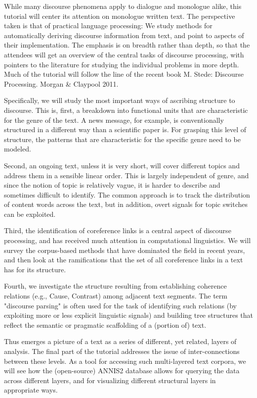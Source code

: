 While many discourse phenomena apply to dialogue and monologue alike, this tutorial will center its attention on monologue written text. The perspective taken is that of practical language processing: We study methods for automatically deriving discourse information from text, and point to aspects of their implementation. The emphasis is on breadth rather than depth, so that the attendees will get an overview of the central tasks of discourse processing, with pointers to the literature for studying the individual problems in more depth. Much of the tutorial will follow the line of the recent book M. Stede: Discourse Processing. Morgan \& Claypool 2011.

Specifically, we will study the most important ways of ascribing structure to discourse. This is, first, a breakdown into functional units that are characteristic for the genre of the text. A news message, for example, is conventionally structured in a different way than a scientific paper is. For grasping this level of structure, the patterns that are characteristic for the specific genre need to be modeled.

Second, an ongoing text, unless it is very short, will cover different topics and address them in a sensible linear order. This is largely independent of genre, and since the notion of topic is relatively vague, it is harder to describe and sometimes difficult to identify. The common approach is to track the distribution of content words across the text, but in addition, overt signals for topic switches can be exploited.

Third, the identification of coreference links is a central aspect of discourse processing, and has received much attention in computational linguistics. We will survey the corpus-based methods that have dominated the field in recent years, and then look at the ramifications that the set of all coreference links in a text has for its structure.

Fourth, we investigate the structure resulting from establishing coherence relations (e.g., Cause, Contrast) among adjacent text segments. The term "discourse parsing" is often used for the task of identifying such relations (by exploiting more or less explicit linguistic signals) and building tree structures that reflect the semantic or pragmatic scaffolding of a (portion of) text.

Thus emerges a picture of a text as a series of different, yet related, layers of analysis. The final part of the tutorial addresses the issue of inter-connections between these levels. As a tool for accessing such multi-layered text corpora, we will see how the (open-source) ANNIS2 database allows for querying the data across different layers, and for visualizing different structural layers in appropriate ways.
